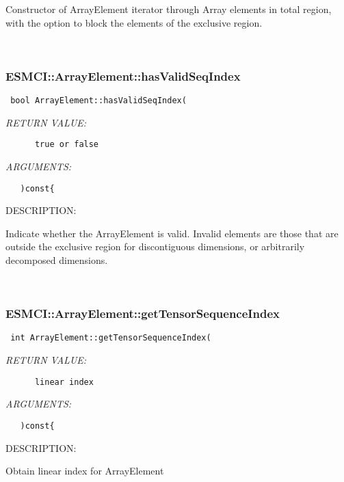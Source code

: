       Constructor of ArrayElement iterator through Array elements in total
      region, with the option to block the elements of the exclusive region.
   
 
\mbox{}\hrulefill\
 
\subsubsection [ESMCI::ArrayElement::hasValidSeqIndex] {ESMCI::ArrayElement::hasValidSeqIndex}


  
\begin{verbatim} bool ArrayElement::hasValidSeqIndex(\end{verbatim}{\em RETURN VALUE:}
\begin{verbatim}      true or false\end{verbatim}{\em ARGUMENTS:}
\begin{verbatim}   )const{\end{verbatim}
{\sf DESCRIPTION:\\ }


      Indicate whether the ArrayElement is valid. Invalid elements are
      those that are outside the exclusive region for discontiguous dimensions,
      or arbitrarily decomposed dimensions.
   
 
\mbox{}\hrulefill\
 
\subsubsection [ESMCI::ArrayElement::getTensorSequenceIndex] {ESMCI::ArrayElement::getTensorSequenceIndex}


  
\begin{verbatim} int ArrayElement::getTensorSequenceIndex(\end{verbatim}{\em RETURN VALUE:}
\begin{verbatim}      linear index\end{verbatim}{\em ARGUMENTS:}
\begin{verbatim}   )const{\end{verbatim}
{\sf DESCRIPTION:\\ }


      Obtain linear index for ArrayElement
   
